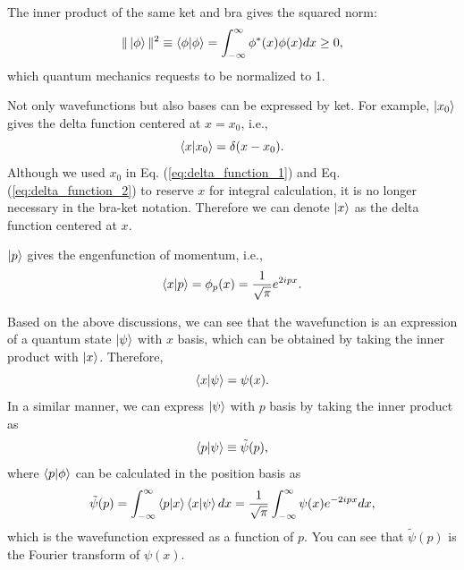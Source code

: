 \documentclass{book}
\begin{document}
The inner product of the same ket and bra gives the squared norm:
\begin{equation}
  \|\ket \phi\|^2 \equiv \braket{\phi|\phi} = \int_{-\infty}^{\infty}\phi^*(x)\phi(x)dx \geq 0,
\end{equation}
which quantum mechanics requests to be normalized to 1.

Not only wavefunctions but also bases can be expressed by ket. For example, $\ket {x_0}$ gives the delta function centered at $x = x_0$, i.e.,
\begin{equation}
  \braket{x|x_0} = \delta(x-x_0).
\end{equation}
Although we used $x_0$ in Eq. (\ref{eq:delta_function_1}) and Eq. (\ref{eq:delta_function_2}) to reserve $x$ for integral calculation, it is no longer necessary in the bra-ket notation. Therefore we can denote $\ket x$ as the delta function centered at $x$. 

$\ket p$ gives the engenfunction of momentum, i.e.,
\begin{equation}
  \braket{x|p} = \phi_p(x) = \frac{1}{\sqrt{\pi}}e^{2ipx}.
\end{equation}

Based on the above discussions, we can see that the wavefunction is an expression of a quantum state $\ket \psi$ with $x$ basis, which can be obtained by taking the inner product with $\ket x$. Therefore,
\begin{equation}
  \braket{x|\psi} = \psi(x).
\end{equation}
In a similar manner, we can express $\ket \psi$ with $p$ basis by taking the inner product as
\begin{equation}
  \braket{p|\psi} \equiv \tilde \psi(p),
\end{equation}
where $\braket{p|\phi}$ can be calculated in the position basis as
\begin{equation}
  \tilde\psi(p) = \int_{-\infty}^{\infty} \braket{p|x}\braket{x|\psi}dx = \frac{1}{\sqrt \pi}\int_{-\infty}^{\infty}\psi(x)e^{-2ipx}dx,
\end{equation}
which is the wavefunction expressed as a function of $p$. You can see that $\tilde \psi(p)$ is the Fourier transform of $\psi(x)$.
\end{document}
